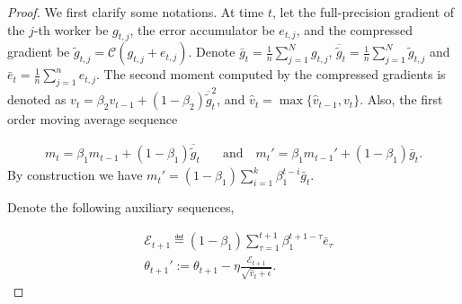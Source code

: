 \documentclass[11pt]{article}
\begin{document}
\begin{proof}
We first clarify some notations. At time $t$, let the full-precision gradient of the $j$-th worker be $g_{t,j}$, the error accumulator be $e_{t,j}$, and the compressed gradient be $\tilde g_{t,j}=\mathcal C(g_{t,j}+e_{t,j})$. Denote $\bar g_t=\frac{1}{n}\sum_{j=1}^N g_{t,j}$, $\overline{\tilde g}_t=\frac{1}{n}\sum_{j=1}^N \tilde g_{t,j}$ and $\bar e_t=\frac{1}{n}\sum_{j=1}^n e_{t,j}$. The second moment computed by the compressed gradients is denoted as $v_t=\beta_2 v_{t-1}+(1-\beta_2) \overline{\tilde g}_t^2$, and $\hat v_t=\max\{\hat v_{t-1}, v_t\}$. Also, the first order moving average sequence

\begin{align*}
m_t=\beta_1 m_{t-1}+(1-\beta_1)\overline{\tilde g}_t \quad & \textrm{and} \quad m_t'=\beta_1 m_{t-1}'+(1-\beta_1) \bar g_t.
\end{align*}
By construction we have $m_t'=(1-\beta_1)\sum_{i=1}^k\beta_1^{t-i} \bar g_t$. 

Denote the following auxiliary sequences,

\begin{align*}
& \mathcal E_{t+1}\eqdef (1-\beta_1)\sum_{\tau=1}^{t+1} \beta_1^{t+1-\tau} \bar e_\tau\\
&\theta_{t+1}':=\theta_{t+1}-\eta \frac{\mathcal E_{t+1}}{\sqrt{\hat v_t+\epsilon}}.
\end{align*}


\end{proof}
\end{document}
